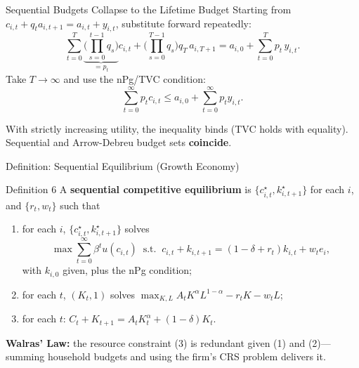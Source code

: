 \documentclass[aspectratio=169,10pt]{beamer}
\newcommand{\apxbutton}[1]{\hfill\hyperlink{#1}{\beamerbutton{Appendix}}}
\begin{document}
\begin{frame}{Sequential Budgets Collapse to the Lifetime Budget}
\hypertarget{m-budget-collapse}{}
Starting from $c_{i,t}+q_t a_{i,t+1}=a_{i,t}+y_{i,t}$, substitute forward repeatedly:
\[
\sum_{t=0}^{T}\underbrace{\Big(\prod_{s=0}^{t-1}q_s\Big)}_{=p_t}c_{i,t}
+\Big(\prod_{s=0}^{T-1}q_s\Big) q_T\, a_{i,T+1}
=
a_{i,0}
+\sum_{t=0}^{T}p_t\, y_{i,t}.
\]
Take $T\to\infty$ and use the nPg/TVC condition:
\[
\sum_{t=0}^{\infty} p_t c_{i,t}
\le
a_{i,0}+\sum_{t=0}^{\infty} p_t y_{i,t}.
\]

With strictly increasing utility, the inequality binds (TVC holds with equality). Sequential and Arrow-Debreu budget sets \textbf{coincide}.

\apxbutton{a15}
\end{frame}

\begin{frame}{Definition: Sequential Equilibrium (Growth Economy)}
\begin{block}{Definition 6}
A \textbf{sequential competitive equilibrium} is $\{c_{i,t}^\star, k_{i,t+1}^\star\}$ for each $i$, and $\{r_t, w_t\}$ such that
\begin{enumerate}
  \item for each $i$, $\{c_{i,t}^\star, k_{i,t+1}^\star\}$ solves
  \[
  \max \sum_{t=0}^{\infty}\beta^t u(c_{i,t}) \;\;\text{s.t.}\;\; c_{i,t}+k_{i,t+1}=(1-\delta+r_t)k_{i,t}+w_t e_i,
  \]
  with $k_{i,0}$ given, plus the nPg condition;
  \item for each $t$, $(K_t,1)$ solves $\max_{K,L} A_t K^\alpha L^{1-\alpha}-r_t K - w_t L$;
  \item for each $t$: $C_t+K_{t+1}=A_t K_t^\alpha+(1-\delta)K_t$.
\end{enumerate}
\end{block}

\medskip
\textbf{Walras' Law:} the resource constraint (3) is redundant given (1) and (2)---summing household budgets and using the firm's CRS problem delivers it.
\end{frame}
\end{document}

